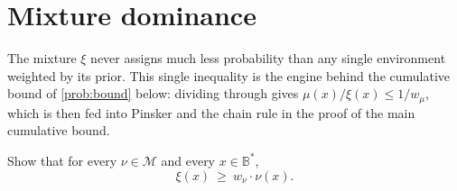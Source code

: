 \documentclass[fontsize=11pt, parskip=half]{scrartcl}
\newcommand{\Mc}{\mathcal{M}}
\begin{document}






\section{Mixture dominance}\label{prob:dominance}

The mixture $\xi$ never assigns much less probability than any single environment
weighted by its prior. This single inequality is the engine behind the cumulative bound
of \cref{prob:bound} below: dividing through gives $\mu(x)/\xi(x) \leq 1/w_\mu$, which
is then fed into Pinsker and the chain rule in the proof of the main cumulative bound.

\begin{exercise}
\label{prob:dominance_ex}



Show that for every $\nu \in \Mc$ and every $x \in \mathbb{B}^*$,
\[
  \xi(x) ~\geq~ w_\nu \cdot \nu(x).
\]
\end{exercise}
\end{document}

